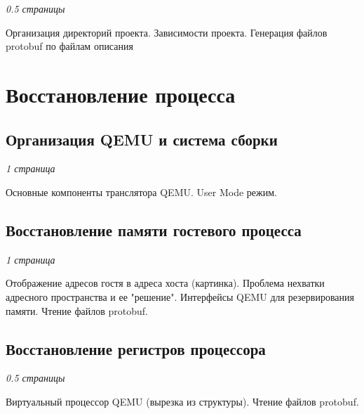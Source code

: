 \textit{0.5 страницы}

Организация директорий проекта. Зависимости проекта. Генерация файлов protobuf по файлам описания

\section{Восстановление процесса}

\subsection{Организация QEMU и система сборки}

\textit{1 страница}

Основные компоненты транслятора QEMU. User Mode режим.

\subsection{Восстановление памяти гостевого процесса}

\textit{1 страница}

Отображение адресов гостя в адреса хоста (картинка). Проблема нехватки адресного пространства и ее "решение". Интерфейсы QEMU для резервирования памяти. Чтение файлов protobuf.

\subsection{Восстановление регистров процессора}

\textit{0.5 страницы}

Виртуальный процессор QEMU (вырезка из структуры). Чтение файлов protobuf.
